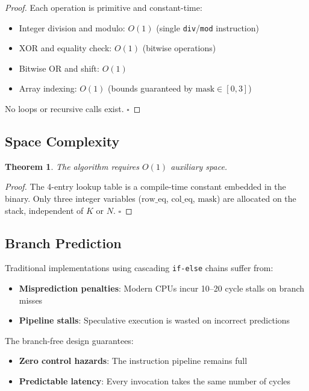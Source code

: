 \documentclass[11pt,a4paper]{article}
\newtheorem{theorem}{Theorem}
\begin{document}
\begin{proof}
Each operation is primitive and constant-time:
\begin{itemize}
    \item Integer division and modulo: $O(1)$ (single \texttt{div}/\texttt{mod} instruction)
    \item XOR and equality check: $O(1)$ (bitwise operations)
    \item Bitwise OR and shift: $O(1)$
    \item Array indexing: $O(1)$ (bounds guaranteed by $\text{mask} \in [0, 3]$)
\end{itemize}
No loops or recursive calls exist. $\square$
\end{proof}

\subsection{Space Complexity}

\begin{theorem}
The algorithm requires $O(1)$ auxiliary space.
\end{theorem}

\begin{proof}
The 4-entry lookup table is a compile-time constant embedded in the binary. Only three integer variables ($\text{row\_eq}$, $\text{col\_eq}$, $\text{mask}$) are allocated on the stack, independent of $K$ or $N$. $\square$
\end{proof}

\subsection{Branch Prediction}

Traditional implementations using cascading \texttt{if-else} chains suffer from:
\begin{itemize}
    \item \textbf{Misprediction penalties}: Modern CPUs incur 10--20 cycle stalls on branch misses
    \item \textbf{Pipeline stalls}: Speculative execution is wasted on incorrect predictions
\end{itemize}

The branch-free design guarantees:
\begin{itemize}
    \item \textbf{Zero control hazards}: The instruction pipeline remains full
    \item \textbf{Predictable latency}: Every invocation takes the same number of cycles
\end{itemize}
\end{document}
